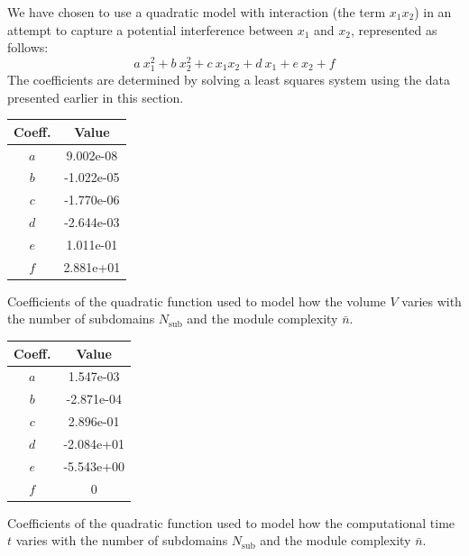 We have chosen to use a quadratic model with interaction (the term $x_1x_2$) in an attempt to capture a potential interference between $x_1$ and $x_2$, represented as follows:
\begin{equation}
    a\:x_1^2+b\:x_2^2+c\:x_1x_2+d\:x_1+e\:x_2+f
\end{equation}
The coefficients are determined by solving a least squares system using the data presented earlier in this section.

\begin{margintable}
    \small
    \centering
    \begin{tabular}{cS[table-number-alignment = center, table-format = 1.2e1]}
    \toprule
    \textbf{Coeff.} & {\textbf{Value}} \\ \midrule
    $a$ & 9.002e-08    \\
    $b$ &  -1.022e-05   \\
    $c$ &  -1.770e-06   \\
    $d$ &  -2.644e-03   \\
    $e$ &   1.011e-01  \\
    $f$ &   2.881e+01  \\
    \bottomrule
    \end{tabular}
    \caption{Coefficients of the quadratic function used to model how the volume $V$ varies with the number of subdomains $N_\text{sub}$ and the module complexity $\bar{n}$.}
    \label{tab:05_doe_coeff_v}
\end{margintable}

\begin{margintable}
    \small
    \centering
    \begin{tabular}{cS[table-number-alignment = center, table-format = 1.2e1]}
    \toprule
    \textbf{Coeff.} & {\textbf{Value}} \\ \midrule
    $a$ & 1.547e-03    \\
    $b$ & -2.871e-04    \\
    $c$ &  2.896e-01   \\
    $d$ &  -2.084e+01   \\
    $e$ &  -5.543e+00   \\
    $f$ & 0    \\
    \bottomrule
    \end{tabular}
    \caption{Coefficients of the quadratic function used to model how the computational time $t$ varies with the number of subdomains $N_\text{sub}$ and the module complexity $\bar{n}$.}
    \label{tab:05_doe_coeff_t}
\end{margintable}

